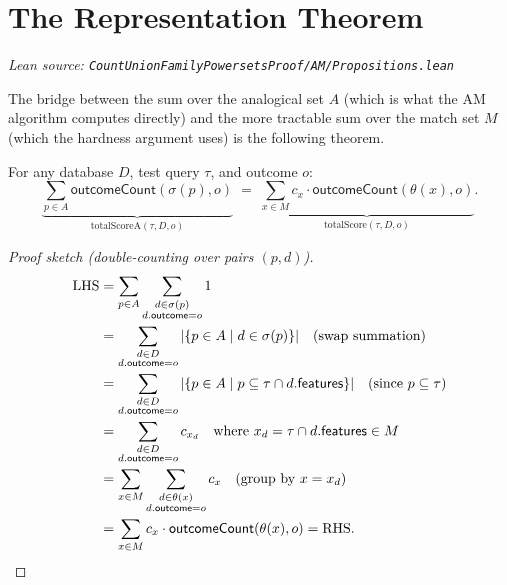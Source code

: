 \chapter{The Representation Theorem}

\emph{Lean source: \texttt{CountUnionFamilyPowersetsProof/AM/Propositions.lean}}

The bridge between the sum over the analogical set $A$ (which is what the AM
algorithm computes directly) and the more tractable sum over the match set $M$
(which the hardness argument uses) is the following theorem.

\begin{theorem}
  \label{thm:representation}
  \leanok
  For any database $D$, test query $\tau$, and outcome $o$:
  \[
    \underbrace{\sum_{p \in A} \mathsf{outcomeCount}(\sigma(p), o)}_{\text{totalScoreA}(\tau,D,o)}
    \;=\;
    \underbrace{\sum_{x \in M} c_x \cdot \mathsf{outcomeCount}(\theta(x), o)}_{\text{totalScore}(\tau,D,o)}.
  \]

  \begin{proof}[Proof sketch (double-counting over pairs $(p, d)$)]
    \begin{align*}
      \text{LHS}
      &= \sum_{p \in A} \sum_{\substack{d \in \sigma(p) \\ d.\mathsf{outcome}=o}} 1 \\
      &= \sum_{\substack{d \in D \\ d.\mathsf{outcome}=o}}
           |\{ p \in A \mid d \in \sigma(p) \}|
         \quad\text{(swap summation)} \\
      &= \sum_{\substack{d \in D \\ d.\mathsf{outcome}=o}}
           |\{ p \in A \mid p \subseteq \tau \cap d.\mathsf{features} \}|
         \quad\text{(since } p \subseteq \tau \text{)} \\
      &= \sum_{\substack{d \in D \\ d.\mathsf{outcome}=o}} c_{x_d}
         \quad\text{where } x_d = \tau \cap d.\mathsf{features} \in M \\
      &= \sum_{x \in M} \sum_{\substack{d \in \theta(x) \\ d.\mathsf{outcome}=o}} c_x
         \quad\text{(group by } x = x_d \text{)} \\
      &= \sum_{x \in M} c_x \cdot \mathsf{outcomeCount}(\theta(x), o)
      = \text{RHS}. \qedhere
    \end{align*}
  \end{proof}
\end{theorem}

